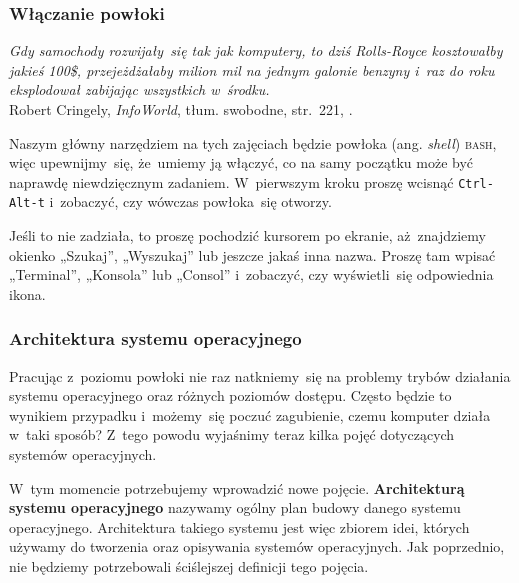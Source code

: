 \documentclass[10pt,t]{beamer}
\begin{document}
\begin{frame}
  \frametitle{Włączanie powłoki}


  \textit{Gdy samochody rozwijały~się tak jak komputery, to dziś
    Rolls-Royce kosztowałby jakieś 100\$, przejeżdżałaby milion mil na
    jednym galonie benzyny i~raz do roku eksplodował zabijając wszystkich
    w~środku.} \\
  Robert Cringely, \textit{InfoWorld}, tłum. swobodne, str.~221,
  \parencite{Garfinkel-Weise-Strassmann-The-UNIX-HATERS-Handbook-Pub-1994}.


  Naszym główny narzędziem na tych zajęciach będzie powłoka
  (ang. \textit{shell}) \textsc{bash}, więc upewnijmy~się, że~umiemy ją
  włączyć, co na samy początku może być naprawdę niewdzięcznym zadaniem.
  W~pierwszym kroku proszę wcisnąć \texttt{Ctrl-Alt-t} i~zobaczyć, czy
  wówczas powłoka~się otworzy.

  Jeśli to nie zadziała, to proszę pochodzić kursorem po ekranie,
  aż~znajdziemy okienko „Szukaj”, „Wyszukaj” lub jeszcze jakaś inna nazwa.
  Proszę tam wpisać „Terminal”, „Konsola” lub „Consol” i~zobaczyć, czy
  wyświetli~się odpowiednia ikona.


\end{frame}





\begin{frame}
  \frametitle{Architektura systemu operacyjnego}


  Pracując z~poziomu powłoki nie raz natkniemy~się na problemy
  trybów działania systemu operacyjnego oraz różnych poziomów dostępu.
  Często będzie to wynikiem przypadku i~możemy~się poczuć zagubienie,
  czemu komputer działa w~taki sposób? Z~tego powodu wyjaśnimy teraz kilka
  pojęć dotyczących systemów operacyjnych.

  W~tym momencie potrzebujemy wprowadzić nowe pojęcie.
  \textbf{Architekturą systemu operacyjnego} nazywamy ogólny plan budowy
  danego systemu operacyjnego. Architektura takiego systemu jest więc
  zbiorem idei, których używamy do tworzenia oraz opisywania systemów
  operacyjnych. Jak poprzednio, nie będziemy potrzebowali ściślejszej
  definicji tego pojęcia.

\end{frame}
\end{document}
